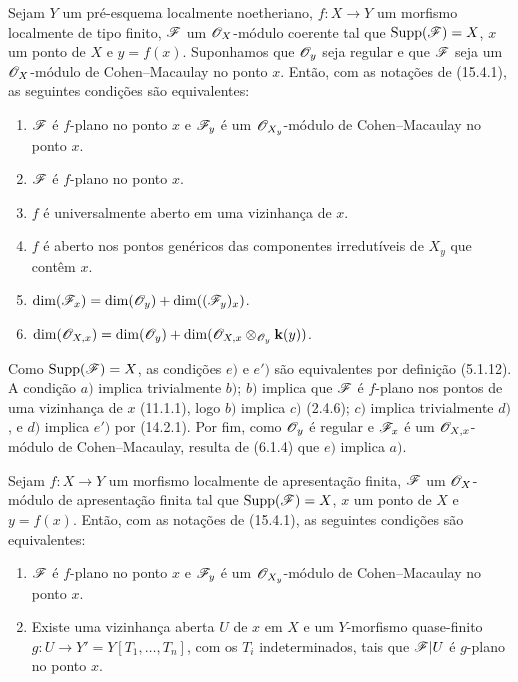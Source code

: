 \begin{proposition}[15.4.2]
\label{IV.15.4.2}
Sejam $Y$ um pré-esquema localmente noetheriano, $f:X\to Y$ um morfismo localmente de tipo finito, $\mathscr{F}$ um $\mathscr{O}_X$-módulo coerente tal que $\operatorname{Supp}(\mathscr{F})=X$, $x$ um ponto de $X$ e $y=f(x)$. Suponhamos que $\mathscr{O}_y$ seja regular e que $\mathscr{F}$ seja um $\mathscr{O}_X$-módulo de Cohen--Macaulay no ponto $x$. Então, com as notações de (15.4.1), as seguintes condições são equivalentes:
\begin{enumerate}[label=\emph{\alph*})]
  \item $\mathscr{F}$ é $f$-plano no ponto $x$ e $\mathscr{F}_y$ é um $\mathscr{O}_{X_y}$-módulo de Cohen--Macaulay no ponto $x$.
  \item $\mathscr{F}$ é $f$-plano no ponto $x$.
  \item $f$ é universalmente aberto em uma vizinhança de $x$.
  \item $f$ é aberto nos pontos genéricos das componentes irredutíveis de $X_y$ que contêm $x$.
  \item $\dim(\mathscr{F}_x)=\dim(\mathscr{O}_y)+\dim((\mathscr{F}_y)_x)$.
  \item[\emph{e}$'$)] $\dim(\mathscr{O}_{X,x})=\dim(\mathscr{O}_y)+\dim(\mathscr{O}_{X,x}\otimes_{\mathscr{O}_y}\mathbf{k}(y))$.
\end{enumerate}
Como $\operatorname{Supp}(\mathscr{F})=X$, as condições $e)$ e $e')$ são equivalentes por definição (5.1.12). A condição $a)$ implica trivialmente $b)$; $b)$ implica que $\mathscr{F}$ é $f$-plano nos pontos de uma vizinhança de $x$ (11.1.1), logo $b)$ implica $c)$ (2.4.6); $c)$ implica trivialmente $d)$, e $d)$ implica $e')$ por (14.2.1). Por fim, como $\mathscr{O}_y$ é regular e $\mathscr{F}_x$ é um $\mathscr{O}_{X,x}$-módulo de Cohen--Macaulay, resulta de (6.1.4) que $e)$ implica $a)$.
\end{proposition}

\begin{proposition}[15.4.3]
\label{IV.15.4.3}
Sejam $f:X\to Y$ um morfismo localmente de apresentação finita, $\mathscr{F}$ um $\mathscr{O}_X$-módulo de apresentação finita tal que $\operatorname{Supp}(\mathscr{F})=X$, $x$ um ponto de $X$ e $y=f(x)$. Então, com as notações de (15.4.1), as seguintes condições são equivalentes:
\begin{enumerate}[label=\emph{\alph*})]
  \item $\mathscr{F}$ é $f$-plano no ponto $x$ e $\mathscr{F}_y$ é um $\mathscr{O}_{X_y}$-módulo de Cohen--Macaulay no ponto $x$.
  \item Existe uma vizinhança aberta $U$ de $x$ em $X$ e um $Y$-morfismo quase-finito $g:U\to Y'=Y[T_1,\ldots,T_n]$, com os $T_i$ indeterminados, tais que $\mathscr{F}|U$ é $g$-plano no ponto $x$.
\end{enumerate}
\end{proposition}

